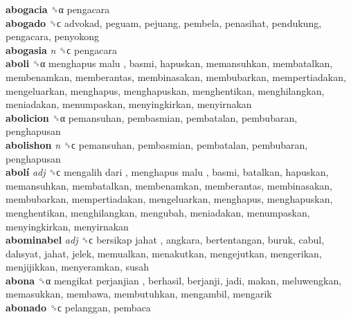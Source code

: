 \textbf{abogacia} ␝α  pengacara  \\
\textbf{abogado} ␝ϲ  advokad, peguam, pejuang, pembela, penasihat, pendukung, pengacara, penyokong  \\
\textbf{abogasia} \emph{n}  ␝ϲ  pengacara  \\
\textbf{aboli} ␝α   menghapus malu , basmi, hapuskan, memansuhkan, membatalkan, membenamkan, memberantas, membinasakan, membubarkan, mempertiadakan, mengeluarkan, menghapus, menghapuskan, menghentikan, menghilangkan, meniadakan, menumpaskan, menyingkirkan, menyirnakan  \\
\textbf{abolicion} ␝α  pemansuhan, pembasmian, pembatalan, pembubaran, penghapusan  \\
\textbf{abolishon} \emph{n}  ␝ϲ  pemansuhan, pembasmian, pembatalan, pembubaran, penghapusan  \\
\textbf{abolí} \emph{adj}  ␝ϲ   mengalih dari ,  menghapus malu , basmi, batalkan, hapuskan, memansuhkan, membatalkan, membenamkan, memberantas, membinasakan, membubarkan, mempertiadakan, mengeluarkan, menghapus, menghapuskan, menghentikan, menghilangkan, mengubah, meniadakan, menumpaskan, menyingkirkan, menyirnakan  \\
\textbf{abominabel} \emph{adj}  ␝ϲ   bersikap jahat , angkara, bertentangan, buruk, cabul, dahsyat, jahat, jelek, memualkan, menakutkan, mengejutkan, mengerikan, menjijikkan, menyeramkan, susah  \\
\textbf{abona} ␝α   mengikat perjanjian , berhasil, berjanji, jadi, makan, meluwengkan, memasukkan, membawa, membutuhkan, mengambil, mengarik  \\
\textbf{abonado} ␝ϲ  pelanggan, pembaca  \\
